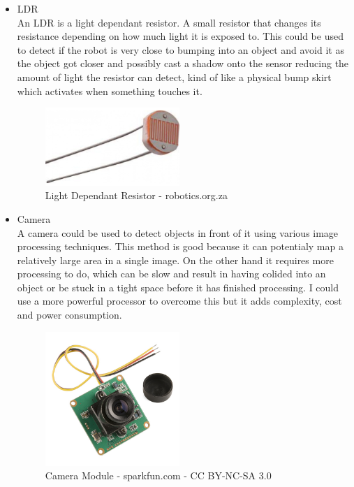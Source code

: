 \begin{itemize}
\item LDR
\\An LDR is a light dependant resistor.  A small resistor that changes its resistance depending on how much light it is exposed to.  This could be used to detect if the robot is very close to bumping into an object and avoid it as the object got closer and possibly cast a shadow onto the sensor reducing the amount of light the resistor can detect, kind of like a physical bump skirt which activates when something touches it.
\begin{figure}[h]
\centering
        \includegraphics[width=2.0in] {Images/ldr.jpg}
        \caption{Light Dependant Resistor - robotics.org.za}
        \label{Light Dependant Resistor}
\end{figure}

\item Camera
\\A camera could be used to detect objects in front of it using various image processing techniques.  This method is good because it can potentialy map a relatively large area in a single image.  On the other hand it requires more processing to do, which can be slow and result in having colided into an object or be stuck in a tight space before it has finished processing.  I could use a more powerful processor to overcome this but it adds complexity, cost and power consumption.
\begin{figure}[h]
\centering
        \includegraphics[width=2.0in] {Images/camera.jpg}
        \caption{Camera Module - sparkfun.com - CC BY-NC-SA 3.0}
        \label{Camera Module}
\end{figure}


\end{itemize}
